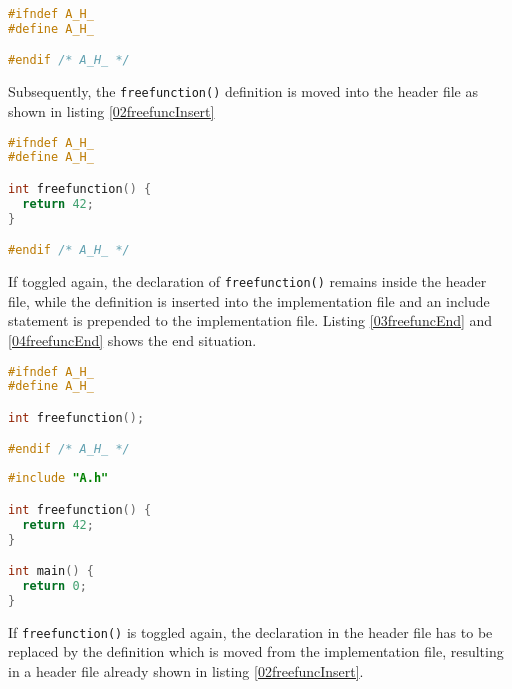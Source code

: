 \begin{lstlisting}[caption={Newly created A.h}, label={02freefuncNewFile},
language=C++]
#ifndef A_H_
#define A_H_

#endif /* A_H_ */
\end{lstlisting}

Subsequently, the \texttt{freefunction()} definition is moved into the header
file as shown in listing \nolinebreak\ref{02freefuncInsert}

\begin{lstlisting}[caption={Inserted \texttt{freefunction()} in A.h},
label={02freefuncInsert}, language=C++]
#ifndef A_H_
#define A_H_

int freefunction() {
  return 42;
}

#endif /* A_H_ */
\end{lstlisting}

If toggled again, the declaration of \texttt{freefunction()} remains inside the
header file, while the definition is inserted into the implementation file and an
include statement is prepended to the implementation file. Listing
\nolinebreak\ref{03freefuncEnd} and \ref{04freefuncEnd} shows the end
situation.

\vspace{0.5cm}
\begin{minipage}{.48\textwidth}
\lstset{xrightmargin=0.5cm}
\begin{lstlisting}[caption={Inserted freefunction in A.h},
label={03freefuncEnd}, language=C++]
#ifndef A_H_
#define A_H_

int freefunction();

#endif /* A_H_ */
\end{lstlisting}
\end{minipage}%
\begin{minipage}{.48\textwidth}
\lstset{xleftmargin=0.5cm}
\begin{lstlisting}[caption={A.cpp},label={04freefuncEnd},language=C++]
#include "A.h"

int freefunction() {
  return 42;
}

int main() {
  return 0;
}
\end{lstlisting}
\end{minipage}

If \texttt{freefunction()} is toggled again, the declaration in the header file
has to be replaced by the definition which is moved from the implementation
file, resulting in a header file already shown in listing
\nolinebreak\ref{02freefuncInsert}.

